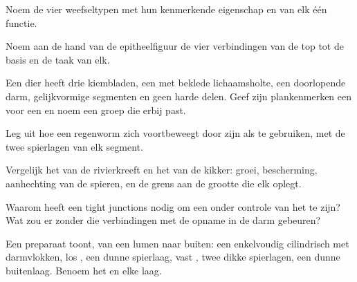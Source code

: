 \begin{exercise}[$\star$]\label{exo:b1:body-plans-tissues:3}
Noem de vier weefseltypen met hun kenmerkende eigenschap en van elk één functie.
\end{exercise}

\begin{exercise}[$\star$]\label{exo:b1:body-plans-tissues:4}
Noem aan de hand van de epitheelfiguur de vier verbindingen van de top tot de
basis en de taak van elk.
\end{exercise}

\begin{exercise}[$\star\star$]\label{exo:b1:body-plans-tissues:5}
Een dier heeft drie kiembladen, een met  beklede lichaamsholte, een
doorlopende darm, gelijkvormige segmenten en geen harde delen. Geef zijn
plankenmerken een voor een en noem een groep die erbij past.
\end{exercise}

\begin{exercise}[$\star\star$]\label{exo:b1:body-plans-tissues:6}
Leg uit hoe een regenworm zich voortbeweegt door zijn  als  te
gebruiken, met de twee spierlagen van elk segment.
\end{exercise}

\begin{exercise}[$\star\star$]\label{exo:b1:body-plans-tissues:7}
Vergelijk het  van de rivierkreeft en het  van de kikker:
groei, bescherming, aanhechting van de spieren, en de grens aan de grootte die
elk oplegt.
\end{exercise}

\begin{exercise}[$\star\star$]\label{exo:b1:body-plans-tissues:8}
Waarom heeft een  tight junctions nodig om een 
onder controle van het  te zijn? Wat zou er zonder die verbindingen met
de opname in de darm gebeuren?
\end{exercise}

\begin{exercise}[$\star\star$]\label{exo:b1:body-plans-tissues:9}
Een preparaat toont, van een lumen naar buiten: een enkelvoudig cilindrisch
 met darmvlokken, los , een dunne spierlaag, vast ,
twee dikke spierlagen, een dunne buitenlaag. Benoem het  en elke laag.
\end{exercise}

